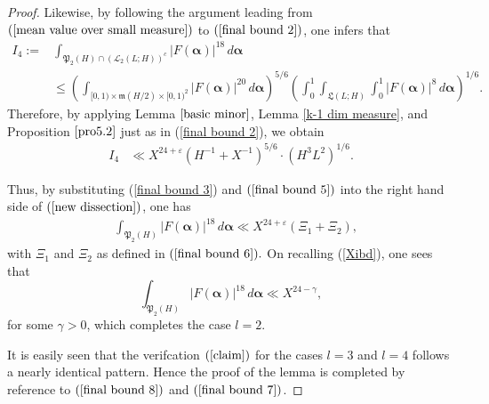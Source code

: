 \documentclass{amsart}%
\numberwithin{equation}{section}
\theoremstyle{remark}
\newcommand{\1}{\mathbbm{1}}
\newcommand{\balp}{\boldsymbol{\alpha}}
\begin{document}
\begin{proof}
Likewise, by following the argument leading from $(\ref{mean value over small measure})$ to $(\ref{final bound 2})$, one infers that 
\begin{equation*}\label{final bound 4}
    \begin{aligned}
  I_4 :=  &\int_{\mathfrak{P}_2(H)\cap (\mathcal{L}_{2}(L;H))^c}|F(\boldsymbol{\alpha})|^{18}\, d\balp \\
     &\leq \left(\int_{[0,1)\times\mathfrak{m}(H/2)\times [0,1)^2}|F(\boldsymbol{\alpha})|^{20}\, d\balp \right)^{5/6} \left(\int_0^1\int_{\mathfrak{L}(L;H)}\int_0^1|F(\boldsymbol{\alpha})|^{8}\, d\balp \right)^{1/6}.
    \end{aligned}
\end{equation*}
Therefore, by applying Lemma $\ref{basic minor}$, Lemma  \ref{k-1 dim measure}, and Proposition $\ref{pro5.2}$ just as in (\ref{final bound 2}), we obtain
\begin{equation}\label{final bound 5}
    \begin{aligned}
  I_4 &\ll X^{24+\varepsilon}\left(H^{-1}+X^{-1}\right)^{5/6}\cdot (H^{3}L^2)^{1/6}.
    \end{aligned}
\end{equation}

Thus, by substituting (\ref{final bound 3}) and $(\ref{final bound 5})$ into the right hand side of $(\ref{new dissection})$, one has
\begin{equation*}
\begin{aligned}
&\int_{\mathfrak{P}_2(H)}|F(\boldsymbol{\alpha})|^{18}\, d\balp \ll X^{24+\varepsilon}(\Xi_1+\Xi_2),
\end{aligned}
\end{equation*}
with $\Xi_1$ and $\Xi_2$ as defined in $(\ref{final bound 6}).$
On recalling (\ref{Xibd}), one sees that
\begin{equation}\label{final bound 7}
\int_{\mathfrak{P}_2(H)}|F(\boldsymbol{\alpha})|^{18}\, d\boldsymbol{\alpha} \ll X^{24-\gamma},
\end{equation}
for some $\gamma>0$, which completes the case $l=2.$ 

It is easily seen that the verifcation $(\ref{claim})$ for the cases $l=3$ and $l=4$ follows a nearly identical pattern. Hence the proof of the lemma is completed by reference to $(\ref{final bound 8})$ and $(\ref{final bound 7})$.
\end{proof}
\end{document}
